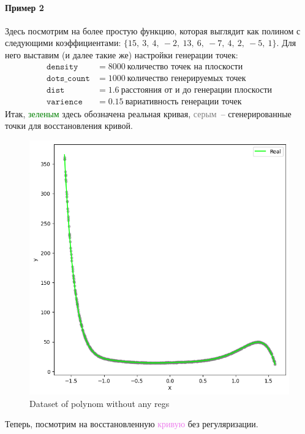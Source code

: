 \documentclass[12pt, a4paper, oneside, final]{article}
\begin{document}
	\paragraph{Пример 2}
	Здесь посмотрим на более простую функцию, которая выглядит как полином с следующими коэффициентами: $\{15,~3,~4,~-2,~13,~6,~-7,~4,~2,~-5,~1\}$. Для него выставим (и далее такие же) настройки генерации точек:
	\begin{align*}
		\mathtt{density} &= 8000~\text{количество точек на плоскости} \\
		\mathtt{dots\_count} &= 1000~\text{количество генерируемых точек} \\
		\mathtt{dist} &= 1.6~\text{расстояния от и до генерации плоскости} \\
		\mathtt{varience} &= 0.15~\text{вариативность генерации точек}
	\end{align*}
	Итак, \textcolor{green}{зеленым} здесь обозначена реальная кривая, \textcolor{gray}{серым}~-- сгенерированные точки для восстановления кривой.
	\begin{figure}[H]
		\centering
		\includegraphics[scale = 0.8]{Image/AT2_V2_DATA.png}
		\caption*{Dataset of polynom without any regs}
	\end{figure}
	Теперь, посмотрим на восстановленную \textcolor{violet}{кривую} без регуляризации.
\end{document}
